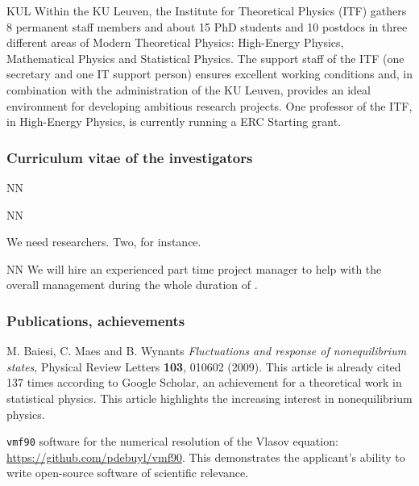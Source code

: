\begin{sitedescription}{KUL}
Within the KU Leuven, the Institute for Theoretical Physics (ITF) gathers 8 permanent staff
members and about 15 PhD students and 10 postdocs in three different areas of Modern
Theoretical Physics: High-Energy Physics, Mathematical Physics and Statistical Physics.
%
The support staff of the ITF (one secretary and one IT support person) ensures excellent
working conditions and, in combination with the administration of the KU Leuven, provides an
ideal environment for developing ambitious research projects. One professor of the
ITF, in High-Energy Physics, is currently running a ERC Starting grant.

\subsubsection*{Curriculum vitae of the investigators}




\begin{participant}[type=res,PM=48,salary=5500]{NN}
\end{participant}
\begin{participant}[type=res,PM=36,salary=5500]{NN}

We need researchers. Two, for instance.

\end{participant}

\begin{participant}[type=res,PM=24,salary=3932]{NN}
  We will hire an experienced part time project manager to help with
  the overall management during the whole duration of \TheProject.
\end{participant}

\subsubsection*{Publications, achievements}

\begin{compactenum}
\item M. Baiesi, C. Maes and B. Wynants {\em Fluctuations and response of nonequilibrium
  states}, Physical Review Letters {\bf 103}, 010602 (2009). This article is already cited
137 times according to Google Scholar, an achievement for a theoretical work in statistical
physics. This article highlights the increasing interest in nonequilibrium physics.
\item {\tt vmf90} software for the numerical resolution of the Vlasov equation:
\url{https://github.com/pdebuyl/vmf90}. This demonstrates the applicant's ability to write
open-source software of scientific relevance.
\end{compactenum}



\end{sitedescription}
